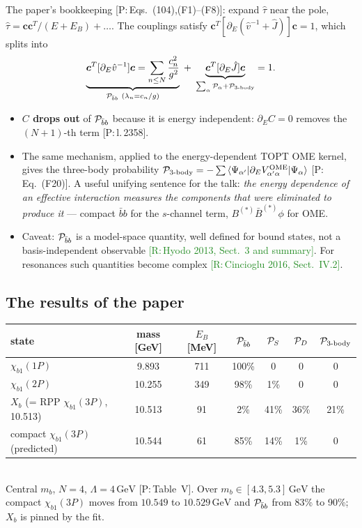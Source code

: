 \documentclass[11pt,a4paper]{article}
\newcommand{\tagP}[1]{\textcolor{blue!65!black}{\textsf{\small[P:\,#1]}}}
\newcommand{\tagR}[1]{\textcolor{ForestGreen}{\textsf{\small[R:\,#1]}}}
\newcommand{\Pbb}{{\cal P}_{\bar bb}}
\newcommand{\GeV}{\,\mathrm{GeV}}
\begin{document}
The paper's bookkeeping \tagP{Eqs.~(104),(F1)--(F8)}: expand $\hat\tau$ near the pole, $\hat\tau=\bm c\bm c^T/(E+E_B)+\dots$. The couplings satisfy $\bm c^T[\partial_E(\hat v^{-1}+\hat J)]\bm c=1$, which splits into
\begin{equation}
\underbrace{\bm c^T[\partial_E\hat v^{-1}]\bm c=\sum_{n\le N}\frac{c_n^2}{g^2}}_{\Pbb\ (\lambda_n=c_n/g)}\;+\;\underbrace{\bm c^T[\partial_E\hat J]\bm c}_{\sum_\alpha{\cal P}_\alpha+{\cal P}_{3\text{-body}}}=1 .
\end{equation}
\begin{itemize}
\item \textbf{$C$ drops out} of $\Pbb$ because it is energy independent: $\partial_EC=0$ removes the $(N+1)$-th term \tagP{l.\,2358}.
\item The same mechanism, applied to the energy-dependent TOPT OME kernel, gives the three-body probability ${\cal P}_{3\text{-body}}=-\sum\braket{\Psi_{\alpha'}|\partial_EV^{\rm OME}_{\alpha'\alpha}|\Psi_\alpha}$ \tagP{Eq.~(F20)}. A useful unifying sentence for the talk: \emph{the energy dependence of an effective interaction measures the components that were eliminated to produce it} --- compact $\bar bb$ for the $s$-channel term, $B^{(*)}\bar B^{(*)}\phi$ for OME.
\item Caveat: $\Pbb$ is a model-space quantity, well defined for bound states, not a basis-independent observable \tagR{Hyodo 2013, Sect.~3 and summary}. For resonances such quantities become complex \tagR{Cincioglu 2016, Sect.~IV.2}.
\end{itemize}

\subsection{The results of the paper}

\begin{center}
\small
\begin{tabular}{lcccccc}
\toprule
state & mass [GeV] & $E_B$ [MeV] & $\Pbb$ & ${\cal P}_S$ & ${\cal P}_D$ & ${\cal P}_{3\text{-body}}$\\
\midrule
$\chi_{b1}(1P)$ & 9.893 & 711 & 100\% & 0 & 0 & 0\\
$\chi_{b1}(2P)$ & 10.255 & 349 & 98\% & 1\% & 0 & 0\\
$X_b$ (= RPP $\chi_{b1}(3P)$, 10.513) & 10.513 & 91 & 2\% & 41\% & 36\% & 21\%\\
compact $\chi_{b1}(3P)$ (predicted) & 10.544 & 61 & 85\% & 14\% & 1\% & 0\\
\bottomrule
\end{tabular}\\[2pt]
{\footnotesize Central $m_b$, $N=4$, $\Lambda=4\GeV$ \tagP{Table~V}. Over $m_b\in[4.3,5.3]\GeV$ the compact $\chi_{b1}(3P)$ moves from $10.549$ to $10.529\GeV$ and $\Pbb$ from 83\% to 90\%; $X_b$ is pinned by the fit.}
\end{center}
\end{document}
